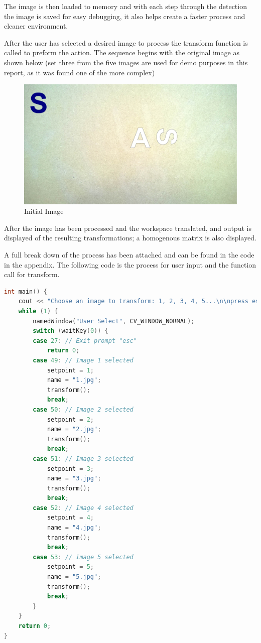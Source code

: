 \documentclass[a4paper, 10pt]{article}
\begin{document}
The image is then loaded to memory and with each step through the detection the image is saved for easy debugging, it also helps create a faster process and cleaner environment. 

After the user has selected a desired image to process the transform function is called to preform the action. The sequence begins with the original image as shown below (set three from the five images are used for demo purposes in this report, as it was found one of the more complex)

\begin{figure}[H]
  \includegraphics[width=\linewidth]{images/3}
  \caption{Initial Image}
  \label{fig:Initial Image}
\end{figure}

After the image has been processed and the workspace translated, and output is displayed of the resulting transformations; a homogenous matrix is also displayed.

A full break down of the process has been attached and can be found in the code in the appendix. The following code is the process for user input and the function call for transform.

\begin{lstlisting}[language = C++]
int main() {
	cout << "Choose an image to transform: 1, 2, 3, 4, 5...\n\npress esc to quit\n\n-------------------------------------------------------------------------\n" << endl;
	while (1) {
		namedWindow("User Select", CV_WINDOW_NORMAL);
		switch (waitKey(0)) {
		case 27: // Exit prompt "esc"
			return 0;
		case 49: // Image 1 selected
			setpoint = 1;
			name = "1.jpg";
			transform();
			break;
		case 50: // Image 2 selected
			setpoint = 2;
			name = "2.jpg";
			transform();
			break;
		case 51: // Image 3 selected
			setpoint = 3;
			name = "3.jpg";
			transform();
			break;
		case 52: // Image 4 selected
			setpoint = 4;
			name = "4.jpg";
			transform();
			break;
		case 53: // Image 5 selected
			setpoint = 5;
			name = "5.jpg";
			transform();
			break;
		}
	}
	return 0;
}
\end{lstlisting}
\end{document}
